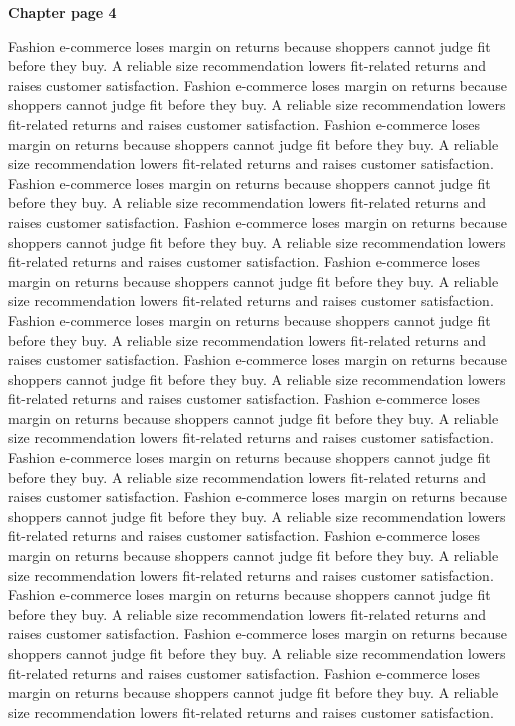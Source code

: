 \documentclass[a4paper,11pt]{article}
\begin{document}
{\headfont\bfseries\Large Chapter page 4}\par\medskip
Fashion e-commerce loses margin on returns because shoppers cannot judge fit before they buy. A reliable size recommendation lowers fit-related returns and raises customer satisfaction. Fashion e-commerce loses margin on returns because shoppers cannot judge fit before they buy. A reliable size recommendation lowers fit-related returns and raises customer satisfaction. Fashion e-commerce loses margin on returns because shoppers cannot judge fit before they buy. A reliable size recommendation lowers fit-related returns and raises customer satisfaction. Fashion e-commerce loses margin on returns because shoppers cannot judge fit before they buy. A reliable size recommendation lowers fit-related returns and raises customer satisfaction. Fashion e-commerce loses margin on returns because shoppers cannot judge fit before they buy. A reliable size recommendation lowers fit-related returns and raises customer satisfaction. 
Fashion e-commerce loses margin on returns because shoppers cannot judge fit before they buy. A reliable size recommendation lowers fit-related returns and raises customer satisfaction. Fashion e-commerce loses margin on returns because shoppers cannot judge fit before they buy. A reliable size recommendation lowers fit-related returns and raises customer satisfaction. Fashion e-commerce loses margin on returns because shoppers cannot judge fit before they buy. A reliable size recommendation lowers fit-related returns and raises customer satisfaction. Fashion e-commerce loses margin on returns because shoppers cannot judge fit before they buy. A reliable size recommendation lowers fit-related returns and raises customer satisfaction. Fashion e-commerce loses margin on returns because shoppers cannot judge fit before they buy. A reliable size recommendation lowers fit-related returns and raises customer satisfaction. 
Fashion e-commerce loses margin on returns because shoppers cannot judge fit before they buy. A reliable size recommendation lowers fit-related returns and raises customer satisfaction. Fashion e-commerce loses margin on returns because shoppers cannot judge fit before they buy. A reliable size recommendation lowers fit-related returns and raises customer satisfaction. Fashion e-commerce loses margin on returns because shoppers cannot judge fit before they buy. A reliable size recommendation lowers fit-related returns and raises customer satisfaction. Fashion e-commerce loses margin on returns because shoppers cannot judge fit before they buy. A reliable size recommendation lowers fit-related returns and raises customer satisfaction. Fashion e-commerce loses margin on returns because shoppers cannot judge fit before they buy. A reliable size recommendation lowers fit-related returns and raises customer satisfaction. \newpage
\end{document}
